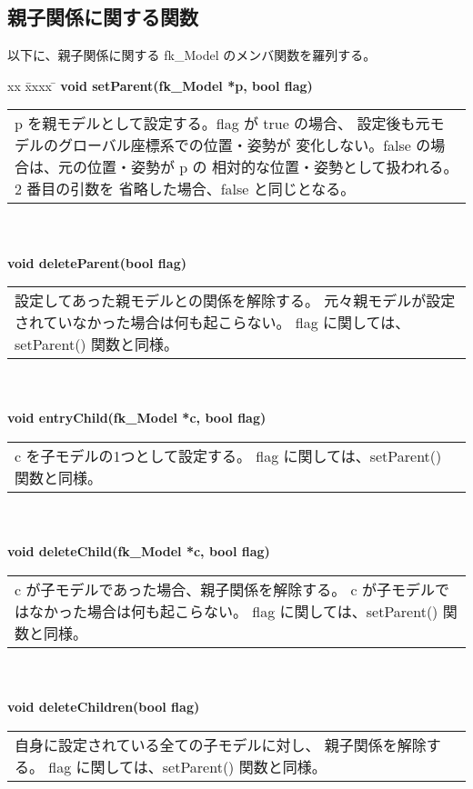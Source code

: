 \subsection{親子関係に関する関数} 
以下に、親子関係に関する fk\_Model のメンバ関数を羅列する。
\begin{tabbing}
xx \= xxxx \= \kill
\> \textbf{void setParent(fk\_Model *p, bool flag)} \\
	\> \> \begin{tabular}{p{15cm}}
		p を親モデルとして設定する。flag が true の場合、
		設定後も元モデルのグローバル座標系での位置・姿勢が
		変化しない。false の場合は、元の位置・姿勢が p の
		相対的な位置・姿勢として扱われる。2 番目の引数を
		省略した場合、false と同じとなる。
	\end{tabular} \\ \\

\> \textbf{void deleteParent(bool flag)} \\
	\> \> \begin{tabular}{p{15cm}}
		設定してあった親モデルとの関係を解除する。
		元々親モデルが設定されていなかった場合は何も起こらない。
		flag に関しては、setParent() 関数と同様。
	\end{tabular} \\ \\

\> \textbf{void entryChild(fk\_Model *c, bool flag)} \\
	\> \> \begin{tabular}{p{15cm}}
		c を子モデルの1つとして設定する。
		flag に関しては、setParent() 関数と同様。
	\end{tabular} \\ \\

\> \textbf{void deleteChild(fk\_Model *c, bool flag)} \\
	\> \> \begin{tabular}{p{15cm}}
		c が子モデルであった場合、親子関係を解除する。
		c が子モデルではなかった場合は何も起こらない。
		flag に関しては、setParent() 関数と同様。
	\end{tabular} \\ \\

\> \textbf{void deleteChildren(bool flag)} \\
	\> \> \begin{tabular}{p{15cm}}
		自身に設定されている全ての子モデルに対し、
		親子関係を解除する。
		flag に関しては、setParent() 関数と同様。
	\end{tabular} \\ \\


\end{tabbing}
